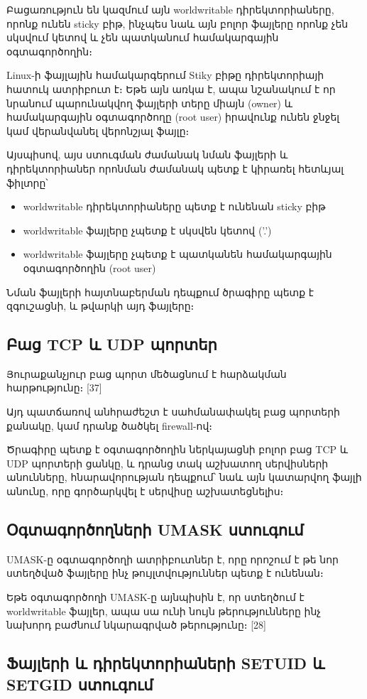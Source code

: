 \documentclass[12pt]{article}
\begin{document}
\begin{sloppypar}
Բացառություն են կազմում այն worldwritable դիրեկտորիաները, որոնք ունեն
sticky բիթ, ինչպես նաև այն բոլոր ֆայլերը որոնք չեն սկսվում կետով և չեն
պատկանում համակարգային օգտագործողին։

Linux-ի ֆայլային համակարգերում Stiky բիթը դիրեկտորիայի հատուկ ատրիբուտ է։
Եթե այն առկա է, ապա նշանակում է որ նրանում պարունակվող ֆայլերի տերը միայն (owner)
և համակարգային օգտագործողը (root user) իրավունք ունեն ջնջել կամ վերանվանել
վերոնշյալ ֆայլը։

Այսպիսով, այս ստուգման ժամանակ նման ֆայլերի և դիրեկտորիաներ որոնման ժամանակ
պետք է կիրառել հետևյալ ֆիլտրը՝

\begin{itemize}
\item worldwritable դիրեկտորիաները պետք է ունենան sticky բիթ
\item worldwritable ֆայլերը չպետք է սկսվեն կետով ('.')
\item worldwritable ֆայլերը չպետք է պատկանեն համակարգային օգտագործողին
	(root user)
\end{itemize}

Նման ֆայլերի հայտնաբերման դեպքում ծրագիրը պետք է զգուշացնի,
և թվարկի այդ ֆայլերը։


\subsection{Բաց TCP և UDP պորտեր}


Յուրաքանչյուր բաց պորտ մեծացնում է հարձակման հարթությունը։ [37]

Այդ պատճառով անհրաժեշտ է սահմանափակել բաց պորտերի քանակը,
կամ դրանք ծածկել firewall-ով։

Ծրագիրը պետք է օգտագործողին ներկայացնի բոլոր բաց 
TCP և UDP պորտերի ցանկը, և դրանց տակ աշխատող սերվիսների
անունները, հնարավորության դեպքում՝ նաև այն կատարվող
ֆայլի անունը, որը գործարկվել է սերվիսը աշխատեցնելիս։


\subsection{Օգտագործողների UMASK ստուգում}


UMASK-ը օգտագործողի ատրիբուտներ է, որը
որոշում է թե նոր ստեղծված ֆայլերը ինչ թույլտվություններ
պետք է ունենան։

Եթե օգտագործողի UMASK-ը այնպիսին է, որ ստեղծում է
worldwritable ֆայլեր, ապա սա ունի նույն թերությունները
ինչ նախորդ բաժնում նկարագրված թերությունը։
[28]


\subsection{Ֆայլերի և դիրեկտորիաների SETUID և SETGID ստուգում}



\end{sloppypar}
\end{document}

